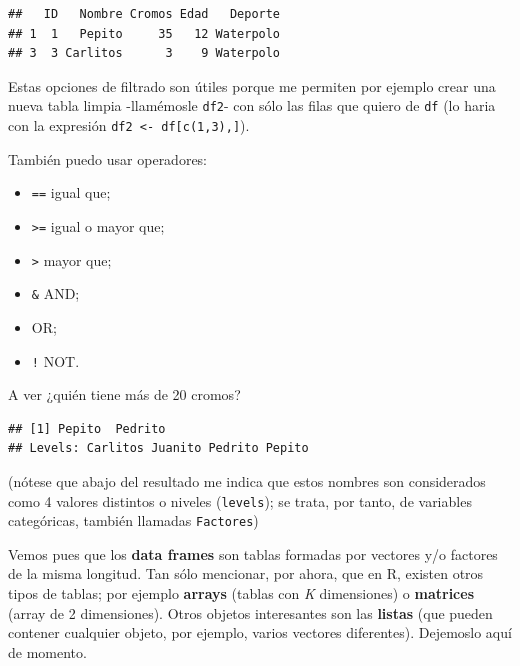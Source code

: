 \documentclass[]{book}
\newenvironment{Shaded}{\begin{snugshade}}{\end{snugshade}}
\newcommand{\DecValTok}[1]{\textcolor[rgb]{0.00,0.00,0.81}{#1}}
\newcommand{\NormalTok}[1]{#1}
\newcommand{\OperatorTok}[1]{\textcolor[rgb]{0.81,0.36,0.00}{\textbf{#1}}}
\newcommand{\StringTok}[1]{\textcolor[rgb]{0.31,0.60,0.02}{#1}}
\providecommand{\tightlist}{%
  \setlength{\itemsep}{0pt}\setlength{\parskip}{0pt}}
\theoremstyle{definition}
\theoremstyle{definition}
\theoremstyle{definition}
\theoremstyle{remark}
\begin{document}
\begin{verbatim}
##   ID   Nombre Cromos Edad   Deporte
## 1  1   Pepito     35   12 Waterpolo
## 3  3 Carlitos      3    9 Waterpolo
\end{verbatim}

Estas opciones de filtrado son útiles porque me permiten por ejemplo
crear una nueva tabla limpia -llamémosle \texttt{df2}- con sólo las
filas que quiero de \texttt{df} (lo haria con la expresión
\texttt{df2\ \textless{}-\ df{[}c(1,3),{]}}).

También puedo usar operadores:

\begin{itemize}
\tightlist
\item
  \texttt{==} igual que;
\item
  \texttt{\textgreater{}=} igual o mayor que;
\item
  \texttt{\textgreater{}} mayor que;
\item
  \texttt{\&} AND;
\item
  \texttt{\textbar{}} OR;
\item
  \texttt{!} NOT.
\end{itemize}

A ver ¿quién tiene más de 20 cromos?

\begin{Shaded}
\end{Shaded}

\begin{verbatim}
## [1] Pepito  Pedrito
## Levels: Carlitos Juanito Pedrito Pepito
\end{verbatim}

(nótese que abajo del resultado me indica que estos nombres son
considerados como 4 valores distintos o niveles (\texttt{levels}); se
trata, por tanto, de variables categóricas, también llamadas
\texttt{Factores})

Vemos pues que los \textbf{data frames} son tablas formadas por vectores
y/o factores de la misma longitud. Tan sólo mencionar, por ahora, que en
R, existen otros tipos de tablas; por ejemplo \textbf{arrays} (tablas
con \emph{K} dimensiones) o \textbf{matrices} (array de 2 dimensiones).
Otros objetos interesantes son las \textbf{listas} (que pueden contener
cualquier objeto, por ejemplo, varios vectores diferentes). Dejemoslo
aquí de momento.
\end{document}
